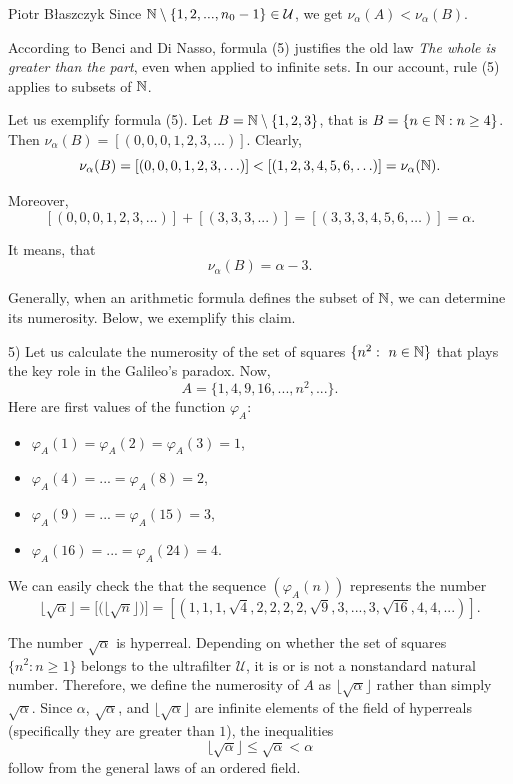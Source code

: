 \begin{artengenv}{Piotr Błaszczyk}
Since ${\mathbb{N}}\setminus\{ 1, 2, ... ,n_0-1\}\in\mathcal U$, we get $\nu_{\alpha}(A)<\nu_{\alpha}(B)$. 

According to Benci and Di Nasso, formula (5) justifies the old law \textit{The whole is greater than the part}, even when applied to infinite sets. In our account, rule (5) applies to subsets of ${\mathbb{N}}$. 



Let us  exemplify formula (5). Let $B={\mathbb{N}}\setminus\{1,2,3\}$, that is $B=\{n\in{\mathbb{N}}: n\geq 4\}$. Then   $\nu_{\alpha}(B)=[(0,0,0,1,2,3,\ldots)]$. Clearly, 
$$\nu_{\alpha}(B)=[(0,0,0,1,2,3,\ldots)]<[(1,2,3,4,5,6,\ldots)]=\nu_{\alpha}({\mathbb{N}}).$$ 

Moreover, 
\[[(0,0,0,1,2,3,\ldots)]+[(3,3,3,...)]=[(3,3,3,4,5,6,\ldots)]=\alpha.\]

It means, that
\[\nu_{\alpha}(B)=\alpha-3.\]

Generally, when an arithmetic formula defines the subset of ${\mathbb{N}}$,  we can determine its numerosity. 
Below, we exemplify this claim.


5) Let us calculate the numerosity of the set of squares $\{n^2:\ n\in{\mathbb{N}}\}$ that plays the key role in the Galileo's paradox. Now,
\[A=\{1,4,9, 16,..., n^2,...\}.\]
Here are first values of the function $\varphi_A$:
\begin{itemize}
\item []$\varphi_{A}(1)=\varphi_{A}(2)=\varphi_{A}(3)=1$,
\item []$\varphi_{A}(4)=...=\varphi_{A}(8)=2$,
\item []$\varphi_{A}(9)=...=\varphi_{A}(15)=3$,
\item []$\varphi_{A}(16)=...=\varphi_{A}(24)=4.$
\end{itemize}

We can easily check the that the sequence $(\varphi_{A}(n))$ represents the number 
\[  \big\lfloor \sqrt\alpha\big\rfloor=  \big[\big(\big\lfloor\sqrt n\big\rfloor\big)\big]=
[(1,1,1,\sqrt 4,2,2,2,2,\sqrt 9,3,...,3,\sqrt{16},4,4,...)].   \]

The number $\sqrt \alpha$ is hyperreal. Depending on whether the set of squares $\{n^2:n \geq 1\}$  belongs to the ultrafilter  $\mathcal U$,  it  is or is not a nonstandard natural number. Therefore, we define  the numerosity of $A$ as 
$\big\lfloor \sqrt\alpha\big\rfloor$ rather than simply $\sqrt \alpha$. Since $\alpha$, $\sqrt \alpha$, and $\big\lfloor \sqrt\alpha\big\rfloor$ are infinite elements of the field of hyperreals (specifically they are greater than $1$), the inequalities 
\[\big\lfloor \sqrt\alpha\big\rfloor \leq \sqrt \alpha<\alpha\]
 follow from the general laws of an ordered field. 
 

\end{artengenv}

